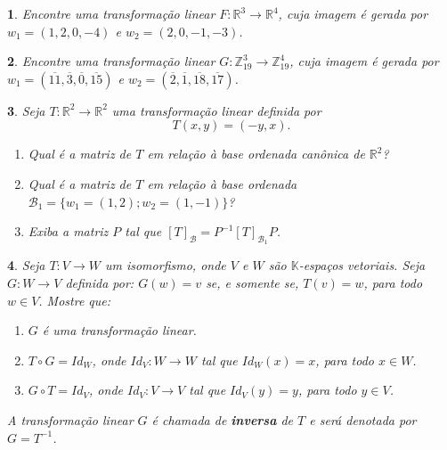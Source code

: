 \documentclass[12pt]{exam}
\newtheorem{exercicio}{}
\newcommand{\z}{\mathbb{Z}}
\newcommand{\real}{\mathbb{R}}
\newcommand{\cp}[1]{\mathbb{#1}}
\begin{document}
\begin{exercicio}
  Encontre uma transforma\c{c}\~ao linear $F : \real^3 \to \real^4$, cuja imagem \'e gerada por $w_1 = (1,2,0,-4)$ e $w_2 = (2,0,-1,-3)$.
\end{exercicio}

\begin{exercicio}
  Encontre uma transforma\c{c}\~ao linear $G : \z_{19}^3 \to \z_{19}^4$, cuja imagem \'e gerada por $w_1 = (\overline{11},\overline{3},\overline{0},\overline{15})$ e $w_2 = (\overline{2},\overline{1},\overline{18},\overline{17})$.
\end{exercicio}

\begin{exercicio}
  Seja $T : \real^2 \to \real^2$ uma transforma\c{c}\~ao linear definida por
  \[
    T(x,y) = (-y,x).
  \]
  \begin{enumerate}[label=({\alph*})]
    \item Qual \'e a matriz de $T$ em rela\c{c}\~ao \`a base ordenada can\^onica de $\real^2$?
    \item Qual \'e a matriz de $T$ em rela\c{c}\~ao \`a base ordenada $\mathcal{B}_1 = \{w_1 = (1,2); w_2 = (1,-1)\}$?
    \item Exiba a matriz $P$ tal que $[T]_{\mathcal{B}} = P^{-1}[T]_{\mathcal{B}_1}P$.
  \end{enumerate}
\end{exercicio}

\begin{exercicio}
  Seja $T : V \to W$ um isomorfismo, onde $V$ e $W$ s\~ao $\cp{K}$-espa\c{c}os vetoriais. Seja $G : W \to V$ definida por: $G(w) = v$ se, e somente se, $T(v) = w$, para todo $w \in V$. Mostre que:
  \begin{enumerate}[label=({\alph*})]
    \item $G$ \'e uma transforma\c{c}\~ao linear.
    \item $T\circ G = Id_W$, onde $Id_V : W \to W$ tal que $Id_W(x) = x$, para todo $x \in W$.
    \item $G\circ T = Id_V$, onde $Id_V : V \to V$ tal que $Id_V(y) = y$, para todo $y \in V$.
  \end{enumerate}
  A transforma\c{c}\~ao linear $G$ \'e chamada de \textbf{inversa} de $T$ e ser\'a denotada por $G = T^{-1}$.
\end{exercicio}
\end{document}
